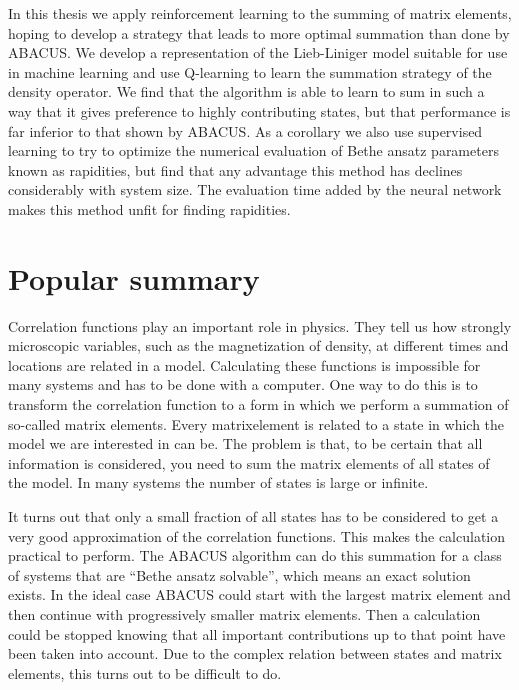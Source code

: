 \documentclass[11pt, a4paper]{report} %
\begin{document}
In this thesis we apply reinforcement learning to the summing of matrix elements, hoping to develop a strategy that leads to more optimal summation than done by ABACUS.\@
We develop a representation of the Lieb-Liniger model suitable for use in machine learning and use Q-learning to learn the summation strategy of the density operator.
We find that the algorithm is able to learn to sum in such a way that it gives preference to highly contributing states, but that performance is far inferior to that shown by ABACUS.\@
As a corollary we also use supervised learning to try to optimize the numerical evaluation of Bethe ansatz parameters known as rapidities, but find that any advantage this method has declines considerably with system size.
The evaluation time added by the neural network makes this method unfit for finding rapidities.

\section*{Popular summary}

Correlation functions play an important role in physics.
They tell us how strongly microscopic variables, such as the magnetization of density, at different times and locations are related in a model.
Calculating these functions is impossible for many systems and has to be done with a computer.
One way to do this is to transform the correlation function to a form in which we perform a summation of so-called matrix elements.
Every matrixelement is related to a state in which the model we are interested in can be.
The problem is that, to be certain that all information is considered, you need to sum the matrix elements of all states of the model.
In many systems the number of states is large or infinite.

It turns out that only a small fraction of all states has to be considered to get a very good approximation of the correlation functions.
This makes the calculation practical to perform.
The ABACUS algorithm can do this summation for a class of systems that are ``Bethe ansatz solvable'', which means an exact solution exists.
In the ideal case ABACUS could start with the largest matrix element and then continue with progressively smaller matrix elements.
Then a calculation could be stopped knowing that all important contributions up to that point have been taken into account.
Due to the complex relation between states and matrix elements, this turns out to be difficult to do.
\end{document}
